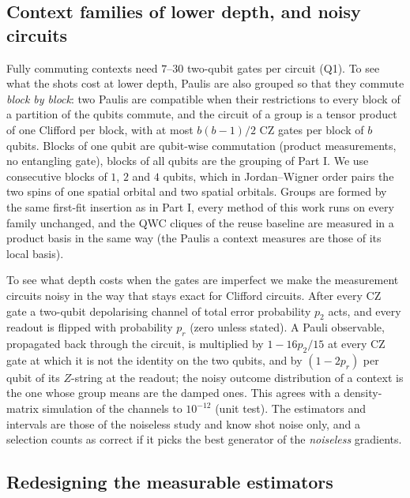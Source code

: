 \documentclass[aps,pra,reprint,superscriptaddress,nofootinbib]{revtex4-2}
\begin{document}
\subsection{Context families of lower depth, and noisy circuits}
\label{sec:depth}

Fully commuting contexts need $7$--$30$ two-qubit gates per circuit (Q1). To see what the shots cost at lower depth, Paulis are also grouped so that they commute \emph{block by block}: two Paulis are compatible when their restrictions to every block of a partition of the qubits commute, and the circuit of a group is a tensor product of one Clifford per block, with at most $b(b-1)/2$ CZ gates per block of $b$ qubits. Blocks of one qubit are qubit-wise commutation (product measurements, no entangling gate), blocks of all qubits are the grouping of Part I. We use consecutive blocks of $1$, $2$ and $4$ qubits, which in Jordan--Wigner order pairs the two spins of one spatial orbital and two spatial orbitals. Groups are formed by the same first-fit insertion as in Part I, every method of this work runs on every family unchanged, and the QWC cliques of the reuse baseline are measured in a product basis in the same way (the Paulis a context measures are those of its local basis).

To see what depth costs when the gates are imperfect we make the measurement circuits noisy in the way that stays exact for Clifford circuits. After every CZ gate a two-qubit depolarising channel of total error probability $p_2$ acts, and every readout is flipped with probability $p_r$ (zero unless stated). A Pauli observable, propagated back through the circuit, is multiplied by $1-16p_2/15$ at every CZ gate at which it is not the identity on the two qubits, and by $(1-2p_r)$ per qubit of its $Z$-string at the readout; the noisy outcome distribution of a context is the one whose group means are the damped ones. This agrees with a density-matrix simulation of the channels to $10^{-12}$ (unit test). The estimators and intervals are those of the noiseless study and know shot noise only, and a selection counts as correct if it picks the best generator of the \emph{noiseless} gradients.

\subsection{Redesigning the measurable estimators}
\label{sec:design}
\end{document}
